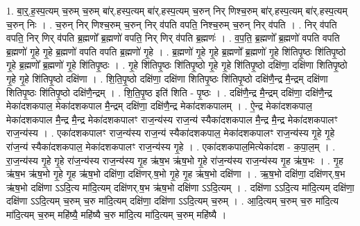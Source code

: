 \documentclass[17pt]{extarticle}
\begin{document}
1. बा॒र्॒.ह॒स्प॒त्यम् च॒रुम् च॒रुम् बा॑र्.हस्प॒त्यम् बा॑र्.हस्प॒त्यम् च॒रुन् निर् णिश्च॒रुम् बा॑र्.हस्प॒त्यम् बा॑र्.हस्प॒त्यम् च॒रुन् निः । . च॒रुन् निर् णिश्च॒रुम् च॒रुन् निर् व॑पति वपति॒ निश्च॒रुम् च॒रुन् निर् व॑पति । . निर् व॑पति वपति॒ निर् णिर् व॑पति ब्र॒ह्मणो᳚ ब्र॒ह्मणो॑ वपति॒ निर् णिर् व॑पति ब्र॒ह्मणः॑ । . व॒प॒ति॒ ब्र॒ह्मणो᳚ ब्र॒ह्मणो॑ वपति वपति ब्र॒ह्मणो॑ गृ॒हे गृ॒हे ब्र॒ह्मणो॑ वपति वपति ब्र॒ह्मणो॑ गृ॒हे । . ब्र॒ह्मणो॑ गृ॒हे गृ॒हे ब्र॒ह्मणो᳚ ब्र॒ह्मणो॑ गृ॒हे शि॑तिपृ॒ष्ठः शि॑तिपृ॒ष्ठो गृ॒हे ब्र॒ह्मणो᳚ ब्र॒ह्मणो॑ गृ॒हे शि॑तिपृ॒ष्ठः । . गृ॒हे शि॑तिपृ॒ष्ठः शि॑तिपृ॒ष्ठो गृ॒हे गृ॒हे शि॑तिपृ॒ष्ठो दक्षि॑णा॒ दक्षि॑णा शितिपृ॒ष्ठो गृ॒हे गृ॒हे शि॑तिपृ॒ष्ठो दक्षि॑णा । . शि॒ति॒पृ॒ष्ठो दक्षि॑णा॒ दक्षि॑णा शितिपृ॒ष्ठः शि॑तिपृ॒ष्ठो दक्षि॑णै॒न्द्र मै॒न्द्रम् दक्षि॑णा शितिपृ॒ष्ठः शि॑तिपृ॒ष्ठो दक्षि॑णै॒न्द्रम् । . शि॒ति॒पृ॒ष्ठ इति॑ शिति - पृ॒ष्ठः । . दक्षि॑णै॒न्द्र मै॒न्द्रम् दक्षि॑णा॒ दक्षि॑णै॒न्द्र मेका॑दशकपाल॒ मेका॑दशकपाल मै॒न्द्रम् दक्षि॑णा॒ दक्षि॑णै॒न्द्र मेका॑दशकपालम् । . ऐ॒न्द्र मेका॑दशकपाल॒ मेका॑दशकपाल मै॒न्द्र मै॒न्द्र मेका॑दशकपालꣳ राज॒न्य॑स्य राज॒न्य॑ स्यैका॑दशकपाल मै॒न्द्र मै॒न्द्र मेका॑दशकपालꣳ राज॒न्य॑स्य । . एका॑दशकपालꣳ राज॒न्य॑स्य राज॒न्य॑ स्यैका॑दशकपाल॒ मेका॑दशकपालꣳ राज॒न्य॑स्य गृ॒हे गृ॒हे रा॑ज॒न्य॑ स्यैका॑दशकपाल॒ मेका॑दशकपालꣳ राज॒न्य॑स्य गृ॒हे । . एका॑दशकपाल॒मित्येका॑दश - क॒पा॒ल॒म् । . रा॒ज॒न्य॑स्य गृ॒हे गृ॒हे रा॑ज॒न्य॑स्य राज॒न्य॑स्य गृ॒ह ऋ॑ष॒भ ऋ॑ष॒भो गृ॒हे रा॑ज॒न्य॑स्य राज॒न्य॑स्य गृ॒ह ऋ॑ष॒भः । . गृ॒ह ऋ॑ष॒भ ऋ॑ष॒भो गृ॒हे गृ॒ह ऋ॑ष॒भो दक्षि॑णा॒ दक्षि॑णर्.ष॒भो गृ॒हे गृ॒ह ऋ॑ष॒भो दक्षि॑णा । . ऋ॒ष॒भो दक्षि॑णा॒ दक्षि॑णर्.ष॒भ ऋ॑ष॒भो दक्षि॑णा ऽऽदि॒त्य मा॑दि॒त्यम् दक्षि॑णर्.ष॒भ ऋ॑ष॒भो दक्षि॑णा ऽऽदि॒त्यम् । . दक्षि॑णा ऽऽदि॒त्य मा॑दि॒त्यम् दक्षि॑णा॒ दक्षि॑णा ऽऽदि॒त्यम् च॒रुम् च॒रु मा॑दि॒त्यम् दक्षि॑णा॒ दक्षि॑णा ऽऽदि॒त्यम् च॒रुम् । . आ॒दि॒त्यम् च॒रुम् च॒रु मा॑दि॒त्य मा॑दि॒त्यम् च॒रुम् महि॑ष्यै॒ महि॑ष्यै च॒रु मा॑दि॒त्य मा॑दि॒त्यम् च॒रुम् महि॑ष्यै । \newline
\end{document}
